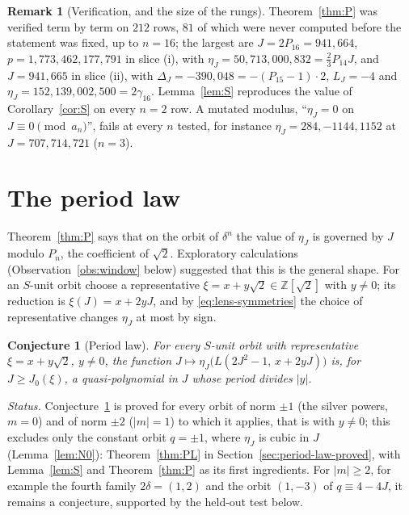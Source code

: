 \documentclass[11pt]{article}
\newtheorem{conjecture}[theorem]{Conjecture}
\theoremstyle{definition}
\newtheorem{remark}[theorem]{Remark}
\newcommand{\Z}{\mathbb Z}
\begin{document}
\begin{remark}[Verification, and the size of the rungs]
\label{rem:P-verification}
Theorem~\ref{thm:P} was verified term by term on $212$ rows, $81$ of
which were never computed before the statement was fixed, up to $n=16$;
the largest are $J=2P_{16}=941{,}664$, $p=1{,}773{,}462{,}177{,}791$ in
slice (i), with $\eta_J=50{,}713{,}000{,}832=\frac23P_{14}J$, and
$J=941{,}665$ in slice (ii), with $\Delta_J=-390{,}048=-(P_{15}-1)\cdot2$,
$L_J=-4$ and $\eta_J=152{,}139{,}002{,}500=2\gamma_{16}$.
Lemma~\ref{lem:S} reproduces the value of Corollary~\ref{cor:S} on every
$n=2$ row.  A mutated modulus, ``$\eta_J=0$ on $J\equiv0\pmod{a_n}$'',
fails at every $n$ tested, for instance $\eta_J=284,-1144,1152$ at
$J=707,714,721$ ($n=3$).
\end{remark}

\section{The period law}
\label{sec:period-law}

Theorem~\ref{thm:P} says that on the orbit of $\delta^n$ the value of
$\eta_J$ is governed by $J$ modulo $P_n$, the coefficient of $\sqrt2$.
Exploratory calculations (Observation~\ref{obs:window} below)
suggested that this is the general shape.  For an $S$-unit orbit choose
a representative $\xi=x+y\sqrt2\in\Z[\sqrt2]$ with $y\neq0$; its
reduction is $\xi(J)=x+2yJ$, and by \eqref{eq:lens-symmetries} the choice
of representative changes $\eta_J$ at most by sign.

\begin{conjecture}[Period law]
\label{conj:PL}
For every $S$-unit orbit with representative $\xi=x+y\sqrt2$, $y\neq0$,
the function $J\mapsto\eta_J\bigl(L(2J^2-1,\,x+2yJ)\bigr)$ is, for
$J\geq J_0(\xi)$, a quasi-polynomial in $J$ whose period divides $|y|$.
\end{conjecture}

\emph{Status.}  Conjecture~\ref{conj:PL} is proved for every orbit of
norm $\pm1$ (the silver powers, $m=0$) and of norm $\pm2$ ($|m|=1$) to
which it applies, that is with $y\neq0$; this excludes only the constant
orbit $q=\pm1$, where $\eta_J$ is cubic in $J$ (Lemma~\ref{lem:N0}):
Theorem~\ref{thm:PL} in Section~\ref{sec:period-law-proved}, with
Lemma~\ref{lem:S} and Theorem~\ref{thm:P} as its first ingredients.  For
$|m|\geq2$, for example the fourth family $2\delta=(1,2)$ and the orbit
$(1,-3)$ of $q\equiv4-4J$, it remains a conjecture, supported by the
held-out test below.
\end{document}
